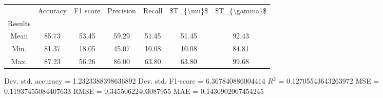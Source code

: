 \begin{tabular}{|c|c|c|c|c|c|c|}
\toprule
{} &  Accuracy &  F1 score &  Precision &  Recall &  \$T\_\{\textbackslash mu\}\$ &  \$T\_\{\textbackslash gamma\}\$ \\
Results &           &           &            &         &            &               \\
\hline
Mean    &     85.73 &     53.45 &      59.29 &   51.45 &      51.45 &         92.43 \\
Min.    &     81.37 &     18.05 &      45.07 &   10.08 &      10.08 &         84.81 \\
Max.    &     87.23 &     56.26 &      86.00 &   63.80 &      63.80 &         99.68 \\
\bottomrule
\end{tabular}

 Dev. std. accuracy = 1.2323388398636892
 Dev. std. F1-score = 6.367840886004414
 $R^2$ = 0.12705543643263972
 MSE = 0.11937455084407633
 RMSE = 0.34550622403087955
 MAE = 0.1430902007454245